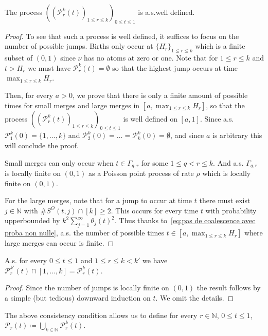 \documentclass[AHL,Unicode,published]{cedram}
\newcommand{\N}{\mathbb{N}}
\newcommand{\1}{\mathbbm{1}}
\newcommand{\Part}{\mathcal{P}}
\begin{document}
\begin{lemm}\label{lemme coalescent continu bien defini}
The process $((\Part_r^k(t))_{1\leq r \leq k})_{0\leq t\leq 1}$ is a.s.\@ well defined.
\end{lemm}

\begin{proof}
To see that such a process is well defined, it suffices to focus on the number of possible jumps. Births only occur at $\{H_r\}_{1\leq r \leq k}$ which is a finite subset of $(0,1)$ since $\nu$ has no atoms at zero or one. Note that for $1\leq r \leq k$ and $t>H_r$ we must have $\Part_r^k(t)=\emptyset$ so that the highest jump occurs at time $\max_{1\leq r \leq k} H_r$.

Then, for every $a>0$, we prove that there is only a finite amount of possible times for small merges and large merges in $[a, \max_{1 \le r \le k} H_r]$, so that the process $((\Part_r^k(t))_{1\leq r \leq k})_{0\leq t\leq 1}$ is well defined on $[a, 1]$. Since a.s. $\Part^k_1(0)=\{1,\dots, k\}$ and $\Part_2^k(0)=\dots=\Part_k^k(0)=\emptyset$, and since $a$ is arbitrary this will conclude the proof.

Small merges can only occur when $t\in \Gamma_{q,r}$ for some $1\leq q<r\leq k$. And a.s. $\Gamma_{q,r}$ is locally finite on $(0,1)$ as a Poisson point process of rate $\rho$ which is locally finite on $(0,1)$.

For the large merges, note {that} for a jump to occur at time $t$ there must exist $j\in \N$ with $\#S^\Theta(t,j)\cap[k]\geq 2$. This occurs for every time $t$ with probability upperbounded by $k^2\sum_{j=1}^\infty \theta_j(t)^2$. Thus thanks to~\eqref{eq:pas de coalescence avec proba non nulle}, a.s. the number of possible times $t \in[a, \max_{1 \le r \le k} H_r]$ where large merges can occur is finite.
\end{proof}

\begin{lemm}
A.s. for every $0\leq t\leq 1$ and $1\leq r \leq k <k'$ we have $\Part_r^{k'}(t)\cap[1,\dots, k]=\Part_r^{k}(t)$.
\end{lemm}

\begin{proof}
Since the number of jumps is locally finite on $(0,1)$ the result follows by a simple (but tedious) downward induction on $t$. We omit the details.
\end{proof}

The above consistency condition allows us to define for every $r\in \N$, $0\leq t \leq 1$, $\Part_r(t)\coloneqq\bigcup_{k\in \N}\Part_r^k(t)$.
\end{document}
